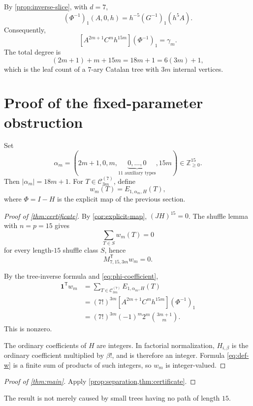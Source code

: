 \documentclass[11pt,reqno]{amsart}
\newcommand{\Z}{\mathbb Z}
\newcommand{\cC}{\mathcal C}
\newcommand{\one}{\mathbf 1}
\begin{document}
By \cref{prop:inverse-slice}, with $d=7$,
\[
 (\Phi^{-1})_1(A,0,h)=h^{-5}(G^{-1})_1(h^5A).
\]
Consequently,
\begin{equation}\label{eq:phi-coefficient}
 [A^{2m+1}C^mh^{15m}](\Phi^{-1})_1=\gamma_m.
\end{equation}
The total degree is
\[
 (2m+1)+m+15m=18m+1=6(3m)+1,
\]
which is the leaf count of a $7$-ary Catalan tree with $3m$ internal
vertices.

\section{Proof of the fixed-parameter obstruction}

Set
\[
 \alpha_m=(2m+1,0,m,\underbrace{0,\ldots,0}_{11\text{ auxiliary types}},15m)
 \in\Z_{\geq0}^{15}.
\]
Then $|\alpha_m|=18m+1$.  For $T\in\cC_{3m}^{(7)}$, define
\begin{equation}\label{eq:def-w}
 w_m(T)=E_{1,\alpha_m,H}(T),
\end{equation}
where $\Phi=I-H$ is the explicit map of the previous section.

\begin{proof}[Proof of \cref{thm:certificate}]
By \cref{cor:explicit-map}, $(JH)^{15}=0$.  The shuffle lemma with
$n=p=15$ gives
\[
 \sum_{T\in S}w_m(T)=0
\]
for every length-$15$ shuffle class $S$, hence
\[
 M_{7,15,3m}^{\mathsf T}w_m=0.
\]

By the tree-inverse formula and \eqref{eq:phi-coefficient},
\begin{align*}
 \one^{\mathsf T}w_m
 &=\sum_{T\in\cC_{3m}^{(7)}}E_{1,\alpha_m,H}(T)\\
 &=(7!)^{3m}[A^{2m+1}C^mh^{15m}](\Phi^{-1})_1\\
 &=(7!)^{3m}(-1)^m2^m\binom{3m+1}{m}.
\end{align*}
This is nonzero.

The ordinary coefficients of $H$ are integers.  In factorial normalization,
$H_{i,\beta}$ is the ordinary coefficient multiplied by $\beta!$, and is
therefore an integer.  Formula \eqref{eq:def-w} is a finite sum of products
of such integers, so $w_m$ is integer-valued.
\end{proof}

\begin{proof}[Proof of \cref{thm:main}]
Apply \cref{prop:separation,thm:certificate}.
\end{proof}

The result is not merely caused by small trees having no path of length
$15$.
\end{document}
